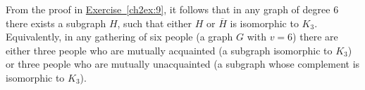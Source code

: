\label{ch2ex:10}
From the proof in \hyperref[ch2ex:9]{Exercise~\ref{ch2ex:9}}, it follows that in
any graph of degree $6$ there exists a subgraph $H$, such that either $H$ or
$\overline{H}$ is isomorphic to $K_{3}$. Equivalently, in any gathering of six
people (a graph $G$ with $v=6$) there are either three people who are mutually
acquainted (a subgraph isomorphic to $K_{3}$) or three people who are mutually
unacquainted (a subgraph whose complement is isomorphic to $K_{3}$).
